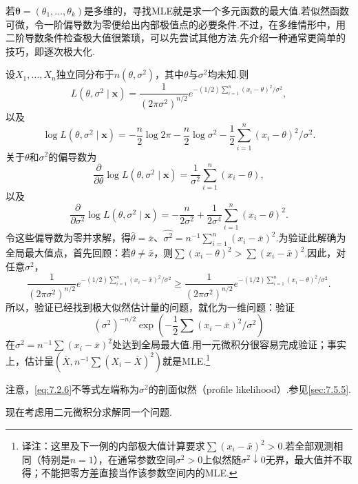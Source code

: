 若$\boldsymbol\theta=(\theta_1,\ldots,\theta_k)$是多维的，寻找MLE就是求一个多元函数的最大值.若似然函数可微，令一阶偏导数为零便给出内部极值点的必要条件.不过，在多维情形中，用二阶导数条件检查极大值很繁琐，可以先尝试其他方法.先介绍一种通常更简单的技巧，即逐次极大化.
\begin{example}\label{ex:7.2.11}
设$X_1,\ldots,X_n$独立同分布于$n(\theta,\sigma^2)$，其中$\theta$与$\sigma^2$均未知.则
$$L(\theta,\sigma^2\mid\boldsymbol x)=\frac1{(2\pi\sigma^2)^{n/2}}e^{-(1/2)\sum_{i=1}^n(x_i-\theta)^2/\sigma^2},$$
以及
$$\log L(\theta,\sigma^2\mid\boldsymbol x)=-\frac n2\log2\pi-\frac n2\log\sigma^2-\frac12\sum_{i=1}^n(x_i-\theta)^2/\sigma^2.$$
关于$\theta$和$\sigma^2$的偏导数为
$$\frac\partial{\partial\theta}\log L(\theta,\sigma^2\mid\boldsymbol x)=\frac1{\sigma^2}\sum_{i=1}^n(x_i-\theta),$$
以及
$$\frac\partial{\partial\sigma^2}\log L(\theta,\sigma^2\mid\boldsymbol x)=-\frac n{2\sigma^2}+\frac1{2\sigma^4}\sum_{i=1}^n(x_i-\theta)^2.$$
令这些偏导数为零并求解，得$\widehat\theta=\bar x$、$\widehat{\sigma^2}=n^{-1}\sum_{i=1}^n(x_i-\bar x)^2$.为验证此解确为全局最大值点，首先回顾：若$\theta\ne\bar x$，则$\sum(x_i-\theta)^2>\sum(x_i-\bar x)^2$.因此，对任意$\sigma^2$，
\begin{equation}\label{eq:7.2.6}
\frac1{(2\pi\sigma^2)^{n/2}}e^{-(1/2)\sum_{i=1}^n(x_i-\bar x)^2/\sigma^2}
\ge\frac1{(2\pi\sigma^2)^{n/2}}e^{-(1/2)\sum_{i=1}^n(x_i-\theta)^2/\sigma^2}.
\end{equation}
所以，验证已经找到极大似然估计量的问题，就化为一维问题：验证
$$ (\sigma^2)^{-n/2}\exp\left(-\frac12\sum(x_i-\bar x)^2/\sigma^2\right) $$
在$\sigma^2=n^{-1}\sum(x_i-\bar x)^2$处达到全局最大值.用一元微积分很容易完成验证；事实上，估计量$(\bar X,n^{-1}\sum(X_i-\bar X)^2)$就是MLE.\footnote{译注：这里及下一例的内部极大值计算要求$\sum(x_i-\bar x)^2>0$.若全部观测相同（特别是$n=1$），在通常参数空间$\sigma^2>0$上似然随$\sigma^2\downarrow0$无界，最大值并不取得；不能把零方差直接当作该参数空间内的MLE.}

注意，\eqref{eq:7.2.6}不等式左端称为$\sigma^2$的剖面似然（profile likelihood）.参见\autoref{sec:7.5.5}.
\end{example}
现在考虑用二元微积分求解同一个问题.
